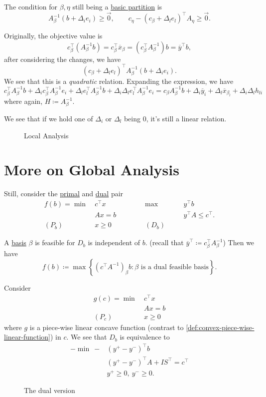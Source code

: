 The condition for \(\beta, \eta\) still being a \hyperref[def:basic-partition]{basic partition} is
\[
	A_{\beta}^{-1}(b+\Delta_{i}e_{i})\geq \vec{0}, \qquad c_{\eta} - (c_{\beta}+\Delta_l e_l)^{\top}A_{\eta}\geq \vec{0}.
\]

Originally, the objective value is
\[
	c_{\beta}^{\top}(A^{-1}_{\beta}b)
	= c_{\beta}^{\top} \overline{x}_{\beta}
	= (c_{\beta}^{\top}A^{-1}_{\beta})b
	= \overline{y}^{\top}b,
\]
after considering the changes, we have
\[
	(c_{\beta}+\Delta_l e_l)^{\top}A^{-1}_{\beta}(b+\Delta_{i}e_{i}).
\]
We see that this is a \emph{quadratic} relation. Expanding the expression, we have
\[
	c_{\beta}^{\top}A^{-1}_{\beta}b + \Delta_{i}c_{\beta}^{\top}A^{-1}_{\beta}e_{i}+\Delta_{l}e_{l}^{\top}A^{-1}_{\beta}b+\Delta_i \Delta_l e_{l}^{\top}A^{-1}_{\beta}e_{i}
	= c_{\beta}A^{-1}_{\beta}b+\Delta_{i}\overline{y}_{i}+\Delta_l \overline{x}_{\beta_l}+\Delta_{i}\Delta_l h_{li}
\]
where again, \(H\coloneqq A^{-1}_{\beta}\).
\begin{remark}
	We see that if we hold one of \(\Delta_i\) or \(\Delta_l\) being \(0\), it's still a linear relation.
\end{remark}

\begin{figure}[H]
	\centering
	\caption{Local Analysis}
	\label{fig:local-analysis}
\end{figure}

\section{More on Global Analysis}
Still, consider the \hyperref[def:primal]{primal} and \hyperref[def:dual]{dual} pair
\[
	\begin{alignedat}{5}
		f(b) = \min~&c^{\top}x\qquad\qquad&&\max ~&&y^{\top}b\\
		&Ax = b 				&&		&&y^{\top}A\leq c^{\top}.\\
		(P_b)\quad	&x\geq  0 	&&(D_b)\quad&&
	\end{alignedat}
\]

A \hyperref[def:basis]{basis} \(\beta\) is feasible for \(D_b\) is independent of \(b\). (recall that \(\overline{y}^{\top}\coloneqq c_{\beta}^{\top}A^{-1}_{\beta}\)) Then we have
\[
	f(b)\coloneqq \max\left\{ (c^{\top}A^{-1})_{\beta}b \colon \beta \text{ is a dual feasible basis} \right\} .
\]

Consider
\[
	\begin{aligned}
		g(c)=\min~ & c^{\top}x \\
		           & Ax = b    \\
		(P_c)\quad & x\geq 0
	\end{aligned}
\]
where \(g\) is a piece-wise linear concave function (contrast to \autoref{def:convex-piece-wise-linear-function}) in \(c\). We see that \(D_b\) is equivalence to
\[
	\begin{aligned}
		-\min~  - & (y^+ - y^-)^{\top}b                         \\
		          & (y^+ - y^-)^{\top}A + I S^{\top} = c^{\top} \\
		          & y^+\geq 0,\ y^- \geq 0.
	\end{aligned}
\]

\begin{figure}[H]
	\centering
	\caption{The dual version}
	\label{fig:local-analysis-dual}
\end{figure}